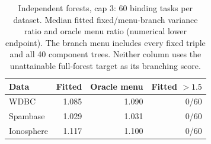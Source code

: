 \begin{table}[t]
\centering
\caption{Independent forests, cap 3: 60 binding tasks per dataset. Median fitted fixed/menu-branch variance ratio and oracle menu ratio (numerical lower endpoint). The branch menu includes every fixed triple and all 40 component trees. Neither column uses the unattainable full-forest target as its branching score.}
\label{tab:forest}
\small
\begin{tabular}{lrrr}
\toprule
Data & Fitted & Oracle menu & Fitted $>1.5$ \\
\midrule
WDBC & 1.085 & 1.090 & 0/60 \\
Spambase & 1.029 & 1.031 & 0/60 \\
Ionosphere & 1.117 & 1.100 & 0/60 \\
\bottomrule
\end{tabular}
\end{table}

